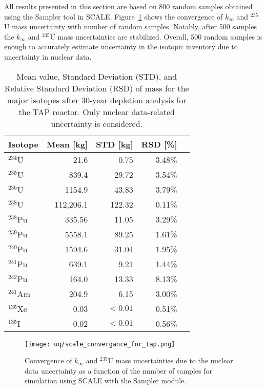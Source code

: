 All results presented in this section are based on 800 random samples obtained 
using the Sampler tool in SCALE. Figure~\ref{fig:uq-scale-convergence} 
shows the convergence of $k_{\infty}$ and $^{235}$U mass uncertainty with 
number of random samples. Notably, after 500 samples the $k_{\infty}$ and 
$^{235}$U mass uncertainties are stabilized. Overall, 500 random samples is 
enough to accurately estimate uncertainty in the isotopic inventory due to 
uncertainty in nuclear data. 

\begin{table}[hbp!]
	\centering
	\caption{Mean value, Standard Deviation (STD), and Relative Standard 
		Deviation (RSD) of mass for the major isotopes after 30-year depletion 
		analysis for the \gls{TAP} reactor. Only nuclear data-related 
		uncertainty is considered.}
	\begin{tabularx}{0.7\textwidth}{L R R R R}
		\hline
		\textbf{Isotope}  & \textbf{Mean [kg]} & \textbf{STD [kg]} & 
		\textbf{RSD [\%]}\\ \hline
		$^{234}$U  & 21.6  & 0.75  & 3.48\% \\
		$^{235}$U  & 839.4 & 29.72 & 3.54\% \\
		$^{236}$U  & 1154.9& 43.83 & 3.79\% \\
		$^{238}$U  & 112,206.1 & 122.32 & 0.11\% \\
		$^{238}$Pu & 335.56& 11.05 & 3.29\% \\
		$^{239}$Pu & 5558.1& 89.25 & 1.61\% \\
		$^{240}$Pu & 1594.6& 31.04 & 1.95\% \\
		$^{241}$Pu & 639.1 & 9.21  & 1.44\% \\
		$^{242}$Pu & 164.0 & 13.33 & 8.13\% \\
		$^{241}$Am & 204.9 & 6.15  & 3.00\% \\
		$^{135}$Xe & 0.03  &$<0.01$& 0.51\% \\
		$^{135}$I  & 0.02  &$<0.01$& 0.56\% \\ \hline
	\end{tabularx}
	\label{tab:uq-scale-mean-std-rsd}
	\vspace{-0.9em}
\end{table}


\begin{figure}[hbp!] %
	\centering
	\texttt{[image: uq/scale\_convergance\_for\_tap.png]}
	\caption{Convergence of $k_{\infty}$ and $^{235}$U mass uncertainties due 
	to the nuclear data uncertainty as a function of the number of samples for 
	simulation using SCALE with the Sampler module.}
	\label{fig:uq-scale-convergence}
\end{figure}

